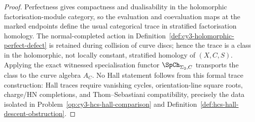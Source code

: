 \begin{proof}
Perfectness gives compactness and dualisability in the holomorphic
factorisation-module category, so the evaluation and coevaluation maps
at the marked endpoints define the usual categorical trace in
stratified factorisation homology. The normal-completed action in
Definition~\ref{def:cy3-holomorphic-perfect-defect} is retained during
collision of curve discs; hence the trace is a class in the
holomorphic, not locally constant, stratified homology of $(X,C,S)$.
Applying the exact witnessed specialisation functor
$\SpCh_{\Sigma_2,C}$ transports the class to the curve algebra $A_C$.
No Hall statement follows from this formal trace construction: Hall
traces require vanishing cycles, orientation-line square roots,
charge/HN completions, and Thom--Sebastiani compatibility, precisely
the data isolated in Problem~\ref{op:cy3-hcs-hall-comparison} and
Definition~\ref{def:hcs-hall-descent-obstruction}.
\end{proof}

